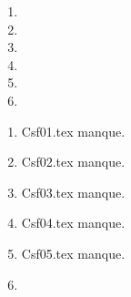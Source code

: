  
 
\begin{enumerate}
  \item  
  \item  
  \item  
  \item  
  \item  
  \item  
\end{enumerate} 
\clearpage 
{}
\begin{enumerate}
  \item Csf01.tex manque. 
  \item Csf02.tex manque. 
  \item Csf03.tex manque. 
  \item Csf04.tex manque. 
  \item Csf05.tex manque. 
  \item  
\end{enumerate} 
